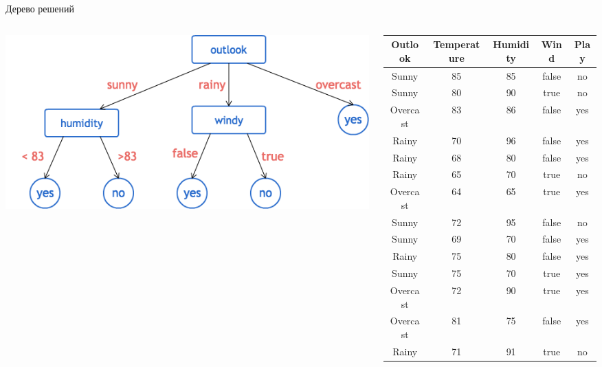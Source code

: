 \documentclass[aspectratio=169]{beamer}
\begin{document}
\begin{frame}{Дерево решений}

\begin{columns}
\begin{column}{.5\textwidth}
\begin{center}
\includegraphics[width=\textwidth]{images/dtree.png}
\end{center}
\end{column}
%
\begin{column}{.5\textwidth}
\begin{tiny}
\begin{center}
\begin{tabular}{c | c | c | c | c }
\bf Outlook & \bf Temperature & \bf Humidity & \bf Wind & \bf Play \\
\hline
Sunny & 85 & 85 & false & no \\
Sunny & 80 & 90 & true & no \\
Overcast & 83 & 86 & false & yes \\
Rainy & 70 & 96 & false & yes \\
Rainy & 68 & 80 & false & yes \\
Rainy & 65 & 70 & true & no \\
Overcast & 64 & 65 & true & yes \\
Sunny & 72 & 95 & false & no \\
Sunny & 69 & 70 & false & yes \\
Rainy & 75 & 80 & false & yes \\
Sunny & 75 & 70 & true & yes \\
Overcast & 72 & 90 & true & yes \\
Overcast & 81 & 75 & false & yes \\
Rainy & 71 & 91 & true & no \\
\end{tabular}
\end{center}
\end{tiny}
\end{column}
\end{columns}

\end{frame}
\end{document}
